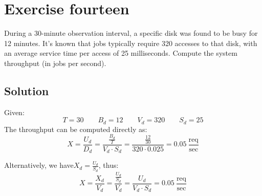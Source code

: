 \section{Exercise fourteen}

During a 30-minute observation interval, a specific disk was found to be busy for 12 minutes. 
It's known that jobs typically require 320 accesses to that disk, with an average service time per access of 25 milliseconds. 
Compute the system throughput (in jobs per second). 

\subsection*{Solution}
Given:
\[T=30 \qquad B_d=12 \qquad V_d=320 \qquad S_d=25\]
The throughput can be computed directly as:
\[X=\dfrac{U_d}{D_d}=\dfrac{\frac{B_d}{T}}{V_d\cdot S_d}=\dfrac{\frac{12}{30}}{320\cdot 0.025}=0.05\:\dfrac{\text{req}}{\text{sec}}\]

Alternatively, we have$X_d=\frac{U_d}{S_d}$, thus: 
\[X=\dfrac{X_d}{V_d}=\dfrac{\frac{U_d}{S_d}}{V_d}=\dfrac{U_d}{V_d\cdot S_d}=0.05\:\dfrac{\text{req}}{\text{sec}}\]